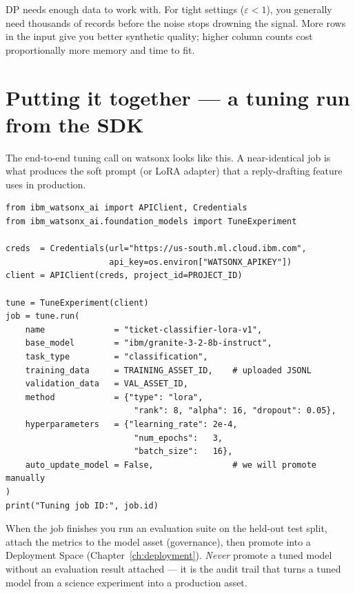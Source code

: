 DP needs enough data to work with. For tight settings ($\varepsilon < 1$), you generally need thousands of records before the noise stops drowning the signal. More rows in the input give you better synthetic quality; higher column counts cost proportionally more memory and time to fit.


\section{Putting it together --- a tuning run from the SDK}

The end-to-end tuning call on watsonx looks like this. A near-identical job is what produces the soft prompt (or LoRA adapter) that a reply-drafting feature uses in production.

\begin{examplebox}[title=\textbf{Launch a LoRA fine-tune via the watsonx Tuning API}]
\begin{lstlisting}[style=pythonstyle]
from ibm_watsonx_ai import APIClient, Credentials
from ibm_watsonx_ai.foundation_models import TuneExperiment

creds  = Credentials(url="https://us-south.ml.cloud.ibm.com",
                     api_key=os.environ["WATSONX_APIKEY"])
client = APIClient(creds, project_id=PROJECT_ID)

tune = TuneExperiment(client)
job = tune.run(
    name              = "ticket-classifier-lora-v1",
    base_model        = "ibm/granite-3-2-8b-instruct",
    task_type         = "classification",
    training_data     = TRAINING_ASSET_ID,    # uploaded JSONL
    validation_data   = VAL_ASSET_ID,
    method            = {"type": "lora",
                          "rank": 8, "alpha": 16, "dropout": 0.05},
    hyperparameters   = {"learning_rate": 2e-4,
                          "num_epochs":   3,
                          "batch_size":   16},
    auto_update_model = False,                # we will promote manually
)
print("Tuning job ID:", job.id)
\end{lstlisting}
\end{examplebox}

When the job finishes you run an evaluation suite on the held-out test split, attach the metrics to the model asset (governance), then promote into a Deployment Space (Chapter~\ref{ch:deployment}). \emph{Never} promote a tuned model without an evaluation result attached --- it is the audit trail that turns a tuned model from a science experiment into a production asset.

